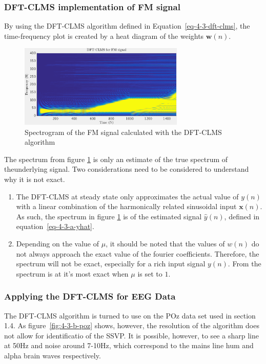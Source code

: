 \documentclass[main.tex]{subfiles}
\begin{document}
\subsubsection{DFT-CLMS implementation of FM signal}

By using the DFT-CLMS algorithm defined in Equation~\ref{eq-4-3-dft-clms}, the time-frequency plot is created by a heat diagram of the weights $\textbf{w}(n)$.

\begin{figure}[H]
	\centering
	\includegraphics[width=0.7\textwidth]{images/4-3-c.png}
	\caption{Spectrogram of the FM signal calculated with the DFT-CLMS algorithm}
	\label{fig:4-3-c}
\end{figure}%

The spectrum from figure \ref{fig:4-3-c} is only an estimate of the true spectrum of theunderlying signal. Two considerations need to be considered to understand why it is not exact. 

\begin{enumerate}
	\item The DFT-CLMS at steady state only approximates the actual value of $y(n)$ with a linear combination of the harmonically related sinusoidal input $\textbf{x}(n)$. As such, the spectrum in figure \ref{fig:4-3-c} is of the estimated signal $\hat{y}(n)$, defined in equation~\ref{eq-4-3-a-yhat}.
	\item Depending on the value of $\mu$, it should be noted that the values of $w(n)$ do not always approach the exact value of the fourier coefficients. Therefore, the spectrum will not be exact, especially for a rich input signal $y(n)$. From \cite{Widrow1987} the spectrum is at it's most exact when $\mu$ is set to $1$.
\end{enumerate}

\subsubsection{Applying the DFT-CLMS for EEG Data}

The DFT-CLMS algorithm is turned to use on the POz data set used in section 1.4. As figure~\ref{fig:4-3-b-poz} shows, however, the resolution of the algorithm does not allow for identificatio of the SSVP. It is possible, however, to see a sharp line at 50Hz and noise around 7-10Hz, which correspond to the mains line hum and alpha brain waves respectively. 
\end{document}
